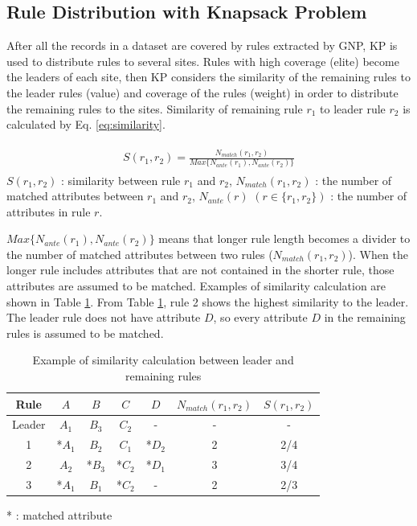 \documentclass{elsart}
\begin{document}
\subsection{Rule Distribution with Knapsack Problem}
After all the records in a dataset are covered by rules extracted by GNP, KP is used to distribute rules to several sites. Rules with high coverage (elite) become the leaders of each site, 
then KP considers the similarity of the remaining rules to the leader rules (value) and coverage of the rules (weight) in order to distribute the remaining rules to the sites. Similarity of remaining rule $r_{1}$ to leader rule $r_{2}$ is calculated by Eq. \ref{eq:similarity}.

\begin{eqnarray}
\begin{array}{lll}
S(r_{1},r_{2})=\frac{N_{match}(r_{1},r_{2})}{Max\{N_{ante}(r_{1}),N_{ante}(r_{2})\}}
\end{array}
\label{eq:similarity}
\end{eqnarray}
$S(r_{1},r_{2})$ : similarity between rule $r_{1}$ and $r_{2}$, $N_{match}(r_{1},r_{2})$ : the number of matched attributes between $r_{1}$ and $r_{2}$, $N_{ante}(r)$ $(r\in\{r_{1},r_{2}\})$ : the number of attributes in rule $r$.

$Max\{N_{ante}(r_{1}),N_{ante}(r_{2})\}$ means that longer rule length becomes a divider to the number of matched attributes between two rules ($N_{match}(r_{1},r_{2})$). When the longer rule includes attributes that are not contained in the shorter rule, those attributes are assumed to be matched. Examples of similarity calculation are shown in Table \ref{remained-rules}. From Table \ref{remained-rules}, rule 2 shows the highest similarity to the leader. The leader rule does not have attribute $D$, so every attribute $D$ in the remaining rules is assumed to be matched.

\begin{table}
\caption{\label{remained-rules}Example of similarity calculation between leader and remaining rules}
\begin{flushleft}
\begin{tabular}{|c|c|c|c|c|c|c|}
\hline 
Rule & $A$ & $B$ & $C$ & $D$ & $N_{match}(r_{1},r_{2})$ & $S(r_{1},r_{2})$\tabularnewline
\hline 
Leader & $A_{1}$ & $B_{3}$ & $C_{2}$ & - & - & -\tabularnewline
\hline 
1 & *$A_{1}$ & $B_{2}$ & $C_{1}$ & *$D_{2}$ & 2 & 2/4\tabularnewline
\hline 
2 & $A_{2}$ & *$B_{3}$ & *$C_{2}$ & *$D_{1}$ & 3 & 3/4\tabularnewline
\hline 
3 & *$A_{1}$ & $B_{1}$ & *$C_{2}$ & - & 2 & 2/3\tabularnewline
\hline 
\end{tabular}
\end{flushleft}
* : matched attribute
\end{table}
\end{document}
